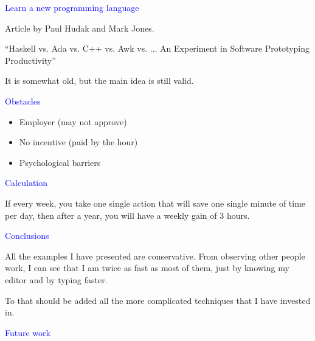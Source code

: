 \documentclass{slides}
\newcommand{\ti}[1]{\begin{center}\Large{\textcolor{blue}{#1}}\end{center}}
\begin{document}
\begin{slide}\ti{Learn a new programming language}

Article by Paul Hudak and Mark Jones.

``Haskell vs. Ada vs. C++ vs. Awk vs. ... An Experiment in Software
Prototyping Productivity''

It is somewhat old, but the main idea is still valid.

\vfill\end{slide}
\begin{slide}\ti{Obstacles}

  \begin{itemize}
  \item Employer (may not approve)
  \item No incentive (paid by the hour)
  \item Psychological barriers
  \end{itemize}

\vfill\end{slide}
\begin{slide}\ti{Calculation}

If every week, you take one single action that will save one single
minute of time per day, then after a year, you will have a weekly gain
of 3 hours.

\vfill\end{slide}
\begin{slide}\ti{}

\vfill\end{slide}
\begin{slide}\ti{Conclusions}

All the examples I have presented are conservative.  From observing
other people work, I can see that I am twice as fast as most of them,
just by knowing my editor and by typing faster.

To that should be added all the more complicated techniques that I
have invested in.

\vfill\end{slide}
\begin{slide}\ti{Future work}

\vfill\end{slide}
\end{document}
